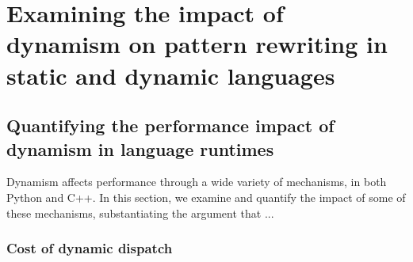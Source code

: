 \chapter{Examining the impact of dynamism on pattern rewriting in static and dynamic languages}
\label{chap:dynamism-pattern-rewriting}









\section{Quantifying the performance impact of dynamism in language runtimes}

Dynamism affects performance through a wide variety of mechanisms, in both Python and C++.
In this section, we examine and quantify the impact of some of these mechanisms, substantiating the argument that ...

\subsection{Cost of dynamic dispatch}

